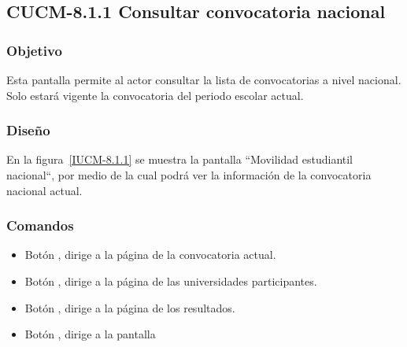 \subsection{CUCM-8.1.1 Consultar convocatoria nacional}
 
\subsubsection{Objetivo}

Esta pantalla permite al actor  consultar la lista de convocatorias a nivel nacional. Solo estará vigente la convocatoria del periodo escolar actual.
\subsubsection{Diseño}

En la figura~\ref{IUCM-8.1.1} se muestra la pantalla ``Movilidad estudiantil nacional“, por medio de la cual podrá ver la información de la convocatoria nacional actual. \\


\subsubsection{Comandos}
\begin{itemize}
	\item Botón , dirige a la página de la convocatoria actual.
	\item Botón , dirige a la página de las universidades participantes.
	\item Botón , dirige a la página de los resultados.
	\item Botón , dirige a la pantalla 
\end{itemize}